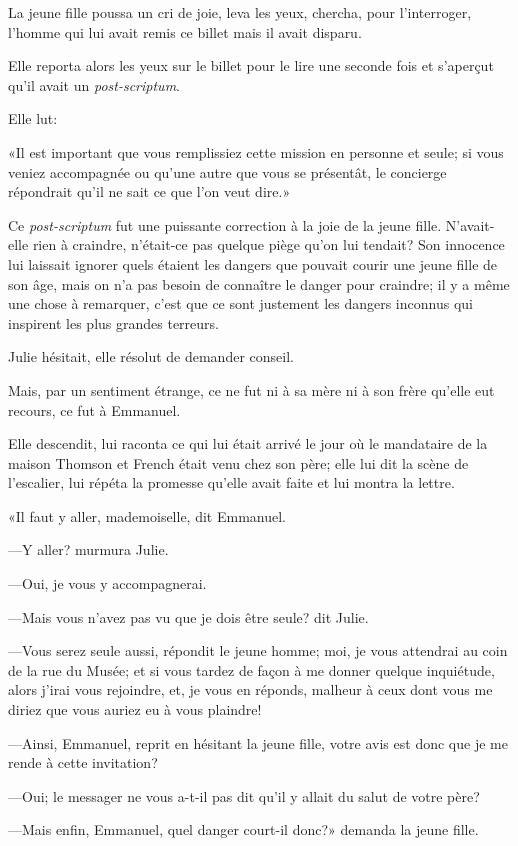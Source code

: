 La jeune fille poussa un cri de joie, leva les yeux, chercha, pour l'interroger, l'homme qui lui avait remis ce billet mais il avait disparu.

Elle reporta alors les yeux sur le billet pour le lire une seconde fois et s'aperçut qu'il avait un \textit{post-scriptum}.

Elle lut:

«Il est important que vous remplissiez cette mission en personne et seule; si vous veniez accompagnée ou qu'une autre que vous se présentât, le concierge répondrait qu'il ne sait ce que l'on veut dire.»

Ce \textit{post-scriptum} fut une puissante correction à la joie de la jeune fille. N'avait-elle rien à craindre, n'était-ce pas quelque piège qu'on lui tendait? Son innocence lui laissait ignorer quels étaient les dangers que pouvait courir une jeune fille de son âge, mais on n'a pas besoin de connaître le danger pour craindre; il y a même une chose à remarquer, c'est que ce sont justement les dangers inconnus qui inspirent les plus grandes terreurs.

Julie hésitait, elle résolut de demander conseil.

Mais, par un sentiment étrange, ce ne fut ni à sa mère ni à son frère qu'elle eut recours, ce fut à Emmanuel.

Elle descendit, lui raconta ce qui lui était arrivé le jour où le mandataire de la maison Thomson et French était venu chez son père; elle lui dit la scène de l'escalier, lui répéta la promesse qu'elle avait faite et lui montra la lettre.

«Il faut y aller, mademoiselle, dit Emmanuel.

—Y aller? murmura Julie.

—Oui, je vous y accompagnerai.

—Mais vous n'avez pas vu que je dois être seule? dit Julie.

—Vous serez seule aussi, répondit le jeune homme; moi, je vous attendrai au coin de la rue du Musée; et si vous tardez de façon à me donner quelque inquiétude, alors j'irai vous rejoindre, et, je vous en réponds, malheur à ceux dont vous me diriez que vous auriez eu à vous plaindre!

—Ainsi, Emmanuel, reprit en hésitant la jeune fille, votre avis est donc que je me rende à cette invitation?

—Oui; le messager ne vous a-t-il pas dit qu'il y allait du salut de votre père?

—Mais enfin, Emmanuel, quel danger court-il donc?» demanda la jeune fille.

